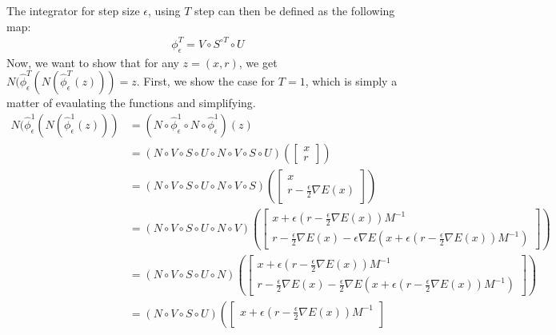 The integrator for step size $\epsilon$, using $T$ step can then be defined as the following map:
\begin{align*}
    \phi^T_\epsilon = V\circ S^{\circ T} \circ U
\end{align*}
Now, we want to show that for any $z=(x, r)$, we get $N(\hat{\phi}^T_\epsilon(N(\hat{\phi}^T_\epsilon(z))) = z$.
First, we show the case for $T=1$, which is simply a matter of evaulating the functions and simplifying.
\begin{equation}
    \begin{aligned}
        N (\hat{\phi}^1_\epsilon(N(\hat{\phi}^1_\epsilon(z))) 
        &=
        (N \circ \hat{\phi}^1_\epsilon \circ N \circ \hat{\phi}^1_\epsilon)(z) \\
        &= (N \circ V \circ S \circ U \circ N \circ V \circ S \circ U )\left( 
        \begin{bmatrix}
            x \\ r
        \end{bmatrix}
        \right) \\
        &= (N\circ V \circ S \circ U \circ N \circ V\circ S) \left(
        \begin{bmatrix}
            x \\ r - \frac{\epsilon}{2} \nabla E(x)
        \end{bmatrix}
        \right) \\
        &= (N\circ V \circ S \circ U \circ N \circ V )\left(
        \begin{bmatrix}
            x + \epsilon (r - \frac{\epsilon}{2} \nabla E(x)) M^{-1} \\ 
            r - \frac{\epsilon}{2} \nabla E(x) - \epsilon \nabla E(x + \epsilon (r - \frac{\epsilon}{2} \nabla E(x)) M^{-1})
        \end{bmatrix}
        \right) \\
        &= (N\circ V \circ S \circ U \circ N )\left(
        \begin{bmatrix}
            x + \epsilon (r - \frac{\epsilon}{2} \nabla E(x)) M^{-1} \\ 
            r - \frac{\epsilon}{2} \nabla E(x) - \frac{\epsilon}{2} \nabla E(x + \epsilon (r - \frac{\epsilon}{2} \nabla E(x)) M^{-1})
        \end{bmatrix}
        \right) \\
        &= (N\circ V \circ S \circ U )\left(
        \begin{bmatrix}
            x + \epsilon (r - \frac{\epsilon}{2} \nabla E(x)) M^{-1} \\ 

\end{bmatrix}
\end{aligned}
\end{equation}
